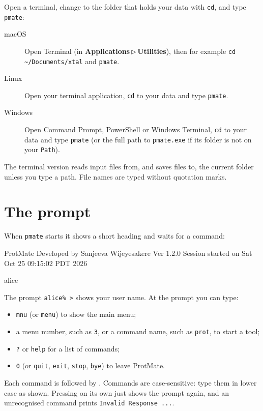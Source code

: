 \documentclass[11pt,a4paper,oneside]{report}
\newcommand{\cmd}[1]{\texttt{#1}}            %
\newcommand{\key}[1]{\fbox{\footnotesize\textsf{#1}}}
\newcommand{\gui}[1]{\textsf{\textbf{#1}}}  %
\newcommand{\menupath}[2]{\gui{#1}\,$\triangleright$\,\gui{#2}}
\begin{document}
Open a terminal, change to the folder that holds your data with \cmd{cd}, and type \cmd{pmate}:

\begin{description}
  \item[macOS] Open Terminal (in \menupath{Applications}{Utilities}), then for example
        \cmd{cd \textasciitilde/Documents/xtal} and \cmd{pmate}.
  \item[Linux] Open your terminal application, \cmd{cd} to your data and type \cmd{pmate}.
  \item[Windows] Open Command Prompt, PowerShell or Windows Terminal, \cmd{cd} to your data and type
        \cmd{pmate} (or the full path to \cmd{pmate.exe} if its folder is not on your \cmd{Path}).
\end{description}

The terminal version reads input files from, and saves files to, the current folder unless you type
a path. File names are typed without quotation marks.

\section{The prompt}

When \cmd{pmate} starts it shows a short heading and waits for a command:

\begin{session}
ProtMate
Developed by Sanjeeva Wijeyesakere
Ver 1.2.0       Session started on Sat Oct 25 09:15:02 PDT 2026

alice%
\end{session}

The prompt \cmd{alice\% >} shows your user name. At the prompt you can type:

\begin{itemize}
  \item \cmd{mnu} (or \cmd{menu}) to show the main menu;
  \item a menu number, such as \cmd{3}, or a command name, such as \cmd{prot}, to start a tool;
  \item \cmd{?} or \cmd{help} for a list of commands;
  \item \cmd{0} (or \cmd{quit}, \cmd{exit}, \cmd{stop}, \cmd{bye}) to leave ProtMate.
\end{itemize}

Each command is followed by \key{Return}. Commands are case-sensitive: type them in lower case as
shown. Pressing \key{Return} on its own just shows the prompt again, and an unrecognised command
prints \cmd{Invalid Response ...}.
\end{document}
